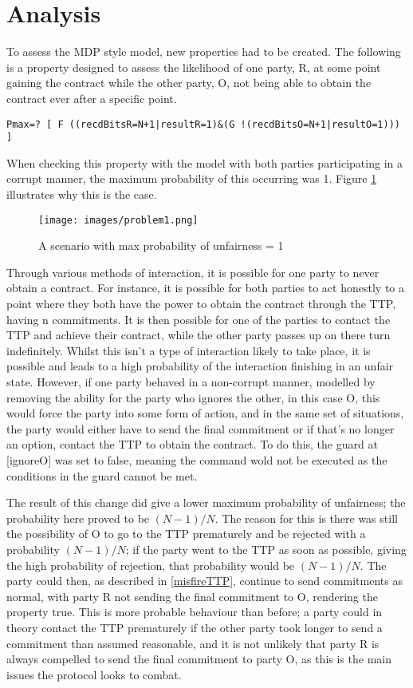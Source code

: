 \documentclass{l4proj}
\begin{document}
\section{Analysis}
 
 
To assess the MDP style model, new properties had to be created. The following is a property designed to assess the likelihood of one party, R, at some point gaining the contract while the other party, O, not being able to obtain the contract ever after a specific point.


\begin{lstlisting}
Pmax=? [ F ((recdBitsR=N+1|resultR=1)&(G !(recdBitsO=N+1|resultO=1))) ]
\end{lstlisting}

When checking this property with the model with both parties participating in a corrupt manner, the maximum probability of this occurring was 1. Figure \ref{problem1} illustrates why this is the case.

\begin{figure}[ht!]
\centering
\texttt{[image: images/problem1.png]}
\caption{A scenario with max probability of unfairness = 1}
\label{problem1}
\end{figure}

Through various methods of interaction, it is possible for one party to never obtain a contract. For instance, it is possible for both parties to act honestly to a point where they both have the power to obtain the contract through the TTP, having n commitments. It is then possible for one of the parties to contact the TTP and achieve their contract, while the other party passes up on there turn indefinitely. Whilst this isn't a type of interaction likely to take place, it is possible and leads to a high probability of the interaction finishing in an unfair state. However, if one party behaved in a non-corrupt manner, modelled by removing the ability for the party who ignores the other, in this case O, this would force the party into some form of action, and in the same set of situations, the party would either have to send the final commitment or if that's no longer an option, contact the TTP to obtain the contract. To do this, the guard at [ignoreO] was set to false, meaning the command wold not be executed as the conditions in the guard cannot be met.


The result of this change did give a lower maximum probability of unfairness; the probability here proved to be $(N-1)/N$. The reason for this is there was still the possibility of O to go to the TTP prematurely and be rejected with a probability $(N-1)/N$; if the party went to the TTP as soon as possible, giving the high probability of rejection, that probability would be $(N-1)/N$. The party could then, as described in \ref{misfireTTP}, continue to send commitments as normal, with party R not sending the final commitment to O, rendering the property true. This is more probable behaviour than before; a party could in theory contact the TTP prematurely if the other party took longer to send a commitment than assumed reasonable, and it is not unlikely that party R is always compelled to send the final commitment to party O, as this is the main issues the protocol looks to combat. 
\end{document}
